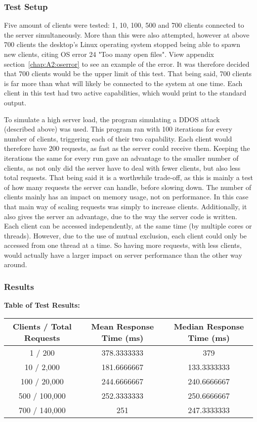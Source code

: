\subsubsection{Test Setup}
Five amount of clients were tested: 1, 10, 100, 500 and 700 clients connected to the server simultaneously. More than this were also attempted, however at above 700 clients the desktop's Linux operating system stopped being able to spawn new clients, citing OS error 24 "Too many open files". View appendix section~\ref{chap:A2:oserror} to see an example of the error. It was therefore decided that 700 clients would be the upper limit of this test. That being said, 700 clients is far more than what will likely be connected to the system at one time. Each client in this test had two active capabilities, which would print to the standard output.

To simulate a high server load, the program simulating a DDOS attack (described above) was used. This program ran with 100 iterations for every number of clients, triggering each of their two capability. Each client would therefore have 200 requests, as fast as the server could receive them. Keeping the iterations the same for every run gave an advantage to the smaller number of clients, as not only did the server have to deal with fewer clients, but also less total requests. That being said it is a worthwhile trade-off, as this is mainly a test of how many requests the server can handle, before slowing down. The number of clients mainly has an impact on memory usage, not on performance. In this case that main way of scaling requests was simply to increase clients. Additionally, it also gives the server an advantage, due to the way the server code is written. Each client can be accessed independently, at the same time (by multiple cores or threads). However, due to the use of mutual exclusion, each client could only be accessed from one thread at a time. So having more requests, with less clients, would actually have a larger impact on server performance than the other way around.

\subsubsection{Results} \label{chap:testing:results}
\begin{center}
    \textbf{Table of Test Results:} 
\begin{tabular}{ |c|c|c| } 
 \hline
 Clients / Total Requests & Mean Response Time (ms) & Median Response Time (ms)\\ 
 \hline
 1 / 200 & 378.3333333 & 379 \\ 
 \hline
 10 / 2,000 & 181.6666667 & 133.3333333 \\ 
 \hline
 100 / 20,000 & 244.6666667 & 240.6666667 \\ 
 \hline
 500 / 100,000 & 252.3333333 & 250.6666667 \\ 
 \hline
 700 / 140,000 & 251 & 247.3333333 \\ 
 \hline
\end{tabular}
\end{center}

